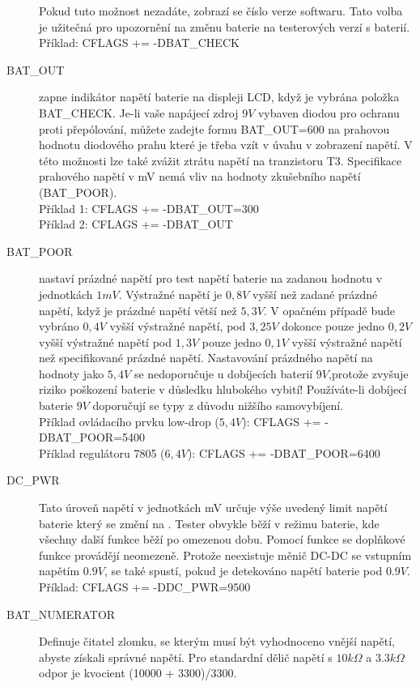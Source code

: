 \begin{description}
  Pokud tuto možnost nezadáte, zobrazí se číslo verze softwaru.
Tato volba je užitečná pro upozornění na změnu baterie na testerových verzí s baterií.\\
Příklad: CFLAGS += -DBAT\_CHECK
  \item[BAT\_OUT] zapne indikátor napětí baterie na displeji LCD, když je vybrána položka BAT\_CHECK.
 Je-li vaše napájecí zdroj \(9V\)  vybaven diodou pro ochranu proti přepólování, můžete
zadejte formu BAT\_OUT=600 na prahovou hodnotu diodového prahu
které je třeba vzít v úvahu v zobrazení napětí.
V této možnosti lze také zvážit ztrátu napětí na tranzistoru T3.
Specifikace prahového napětí v mV nemá vliv na hodnoty zkušebního napětí (BAT\_POOR).\\
Příklad 1: CFLAGS += -DBAT\_OUT=300 \\
Příklad 2: CFLAGS += -DBAT\_OUT
  \item[BAT\_POOR]  nastaví prázdné napětí pro test napětí baterie na zadanou hodnotu v jednotkách \(1mV\).
Výstražné napětí je \(0,8V\) vyšší než zadané prázdné napětí, když je prázdné napětí větší než \(5,3V\).
V opačném případě bude vybráno \(0,4V\) vyšší výstražné napětí,
pod \(3,25V\) dokonce pouze jedno \(0,2V\) vyšší výstražné napětí pod \(1,3V\) pouze
jedno \(0,1V\) vyšší výstražné napětí než specifikované prázdné napětí.
Nastavování prázdného napětí na hodnoty jako \(5,4V\) se nedoporučuje u dobíjecích
baterií \(9V\),protože zvyšuje riziko poškození baterie v důsledku hlubokého vybití!
Používáte-li dobíjecí baterie \(9V\) doporučují se typy  z důvodu nižšího samovybíjení.\\
Příklad ovládacího prvku low-drop (\(5,4V\)): CFLAGS += -DBAT\_POOR=5400 \\
Příklad regulátoru 7805 (\(6,4V\)): CFLAGS += -DBAT\_POOR=6400
  \item[DC\_PWR] Tato úroveň napětí v jednotkách mV určuje výše uvedený limit napětí baterie
který se změní na .
Tester obvykle běží v režimu baterie, kde všechny další funkce běží po omezenou dobu.
Pomocí funkce  se doplňkové funkce provádějí neomezeně.
Protože neexistuje měnič DC-DC se vstupním napětím \(0.9V\),
 se také spustí, pokud je detekováno napětí baterie pod  \(0.9V\).\\
Příklad: CFLAGS += -DDC\_PWR=9500
 \item[BAT\_NUMERATOR] Definuje čitatel zlomku, se kterým musí být vyhodnoceno vnější napětí,
abyste získali správné napětí.
Pro standardní dělič napětí s \(10 k\Omega\) a \(3.3 k\Omega\) odpor je kvocient (10000 + 3300)/3300.

\end{description}
